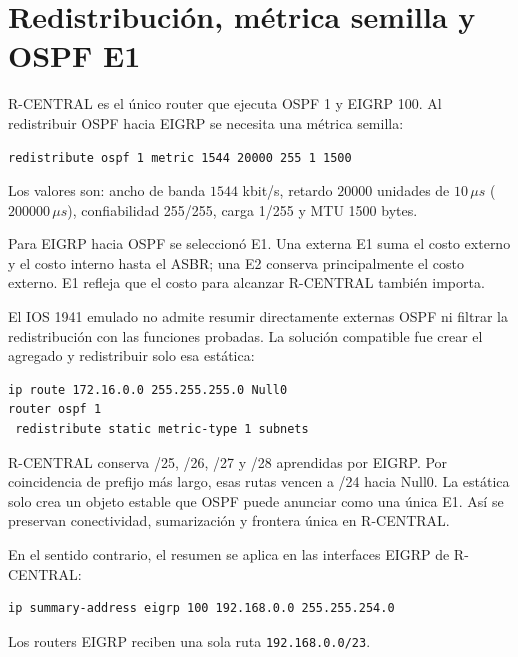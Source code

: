 \documentclass[11pt]{article}
\begin{document}
\section{Redistribución, métrica semilla y OSPF E1}

R-CENTRAL es el único router que ejecuta OSPF 1 y EIGRP 100. Al redistribuir OSPF hacia EIGRP se necesita una métrica semilla:
\begin{verbatim}
redistribute ospf 1 metric 1544 20000 255 1 1500
\end{verbatim}
Los valores son: ancho de banda $1544$ kbit/s, retardo $20000$ unidades de $10\,\mu s$ ($200000\,\mu s$), confiabilidad 255/255, carga 1/255 y MTU 1500 bytes.

Para EIGRP hacia OSPF se seleccionó E1. Una externa E1 suma el costo externo y el costo interno hasta el ASBR; una E2 conserva principalmente el costo externo. E1 refleja que el costo para alcanzar R-CENTRAL también importa.

El IOS 1941 emulado no admite resumir directamente externas OSPF ni filtrar la redistribución con las funciones probadas. La solución compatible fue crear el agregado y redistribuir solo esa estática:
\begin{verbatim}
ip route 172.16.0.0 255.255.255.0 Null0
router ospf 1
 redistribute static metric-type 1 subnets
\end{verbatim}

\begin{decision}
R-CENTRAL conserva /25, /26, /27 y /28 aprendidas por EIGRP. Por coincidencia de prefijo más largo, esas rutas vencen a /24 hacia Null0. La estática solo crea un objeto estable que OSPF puede anunciar como una única E1. Así se preservan conectividad, sumarización y frontera única en R-CENTRAL.
\end{decision}

En el sentido contrario, el resumen se aplica en las interfaces EIGRP de R-CENTRAL:
\begin{verbatim}
ip summary-address eigrp 100 192.168.0.0 255.255.254.0
\end{verbatim}
Los routers EIGRP reciben una sola ruta \texttt{192.168.0.0/23}.
\end{document}
